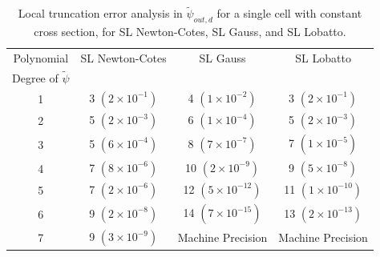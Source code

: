 %
%
\begin{table}[!htp]
\centering
\caption{Local truncation error analysis in $\widetilde{\psi}_{out,d}$ for a single cell with constant cross section, for SL Newton-Cotes, SL Gauss, and SL Lobatto.}
\begin{tabular}{|c|c|c|c|} 
\hline
  Polynomial 										 & SL Newton-Cotes 					& SL Gauss 			 					& SL Lobatto  \\
  Degree  of $\widetilde{\psi}$	& {}		 							 			& {}   										&	 {}   \\
  	\hline
				1   										&	3 $(2\times 10^{-1})$		&	4 $(1\times 10^{-2})$			&	3 $(2\times 10^{-1})$	\\
		\hline
				2   										&	5 $(2\times 10^{-3})$			&	6 $(1\times 10^{-4})$		&	5 $(2\times 10^{-3})$		\\
		\hline	
				3   										&	5 $(6\times 10^{-4})$		&	8 $(7\times 10^{-7})$			&	7 $(1\times 10^{-5})$	\\
		\hline
				4   										&	7 $(8\times 10^{-6})$		&	10 $(2\times 10^{-9})$		&	9 $(5\times 10^{-8})$	\\
		\hline
				5   										&	7 $(2\times 10^{-6})$		&	12 $(5\times 10^{-12})$		&	11 $(1\times 10^{-10})$	\\
		\hline		
				6   										&	9 $(2\times 10^{-8})$		&	14 $(7\times 10^{-15})$		&	13 $(2\times 10^{-13})$\\
		\hline
				7   										&	9 $(3\times 10^{-9})$		& Machine Precision					&	Machine Precision  \\
		\hline
\end{tabular}
\label{tbl:taylor_out_part2} 
\end{table}


